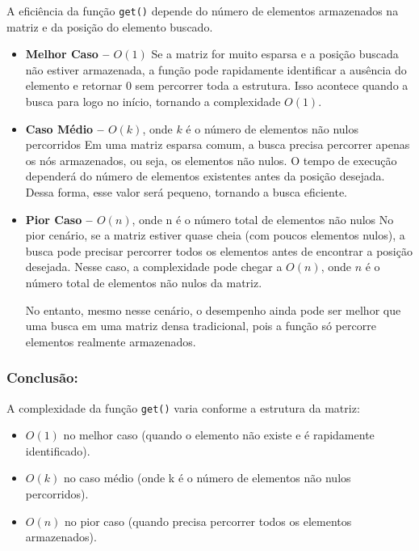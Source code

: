 \documentclass[12pt]{article}
\begin{document}
        A eficiência da função \texttt{get()} depende do número de elementos armazenados na matriz e da posição do elemento buscado. 
    
            \begin{itemize}
                \item \textbf{Melhor Caso – \(O(1)\)}
                Se a matriz for muito esparsa e a posição buscada não estiver armazenada, a função pode rapidamente identificar a ausência do elemento e retornar 0 sem percorrer toda a estrutura. Isso acontece quando a busca para logo no início, tornando a complexidade \(O(1)\). 
                
                \item \textbf{Caso Médio – \(O(k)\)}, onde \(k\) é o número de elementos não nulos percorridos 
                Em uma matriz esparsa comum, a busca precisa percorrer apenas os nós armazenados, ou seja, os elementos não nulos. O tempo de execução dependerá do número de elementos existentes antes da posição desejada. Dessa forma, esse valor será pequeno, tornando a busca eficiente. 
                
                \item \textbf{Pior Caso – \(O(n)\)}, onde n é o número total de elementos não nulos
                No pior cenário, se a matriz estiver quase cheia (com poucos elementos nulos), a busca pode precisar percorrer todos os elementos antes de encontrar a posição desejada. Nesse caso, a complexidade pode chegar a \(O(n)\), onde \(n\) é o número total de elementos não nulos da matriz.  
                
                No entanto, mesmo nesse cenário, o desempenho ainda pode ser melhor que uma busca em uma matriz densa tradicional, pois a função só percorre elementos realmente armazenados.  
                
            \end{itemize} 
    
        \subsubsection{Conclusão:}
        
        A complexidade da função \texttt{get()} varia conforme a estrutura da matriz:  

        \begin{itemize}
            \item  \textbf{\(O(1)\)} no melhor caso (quando o elemento não existe e é rapidamente identificado).
            \item  \textbf{\(O(k)\)} no caso médio (onde k é o número de elementos não nulos percorridos). 
            \item  \textbf{\(O(n)\)} no pior caso (quando precisa percorrer todos os elementos armazenados).  
        \end{itemize}
        
\end{document}
